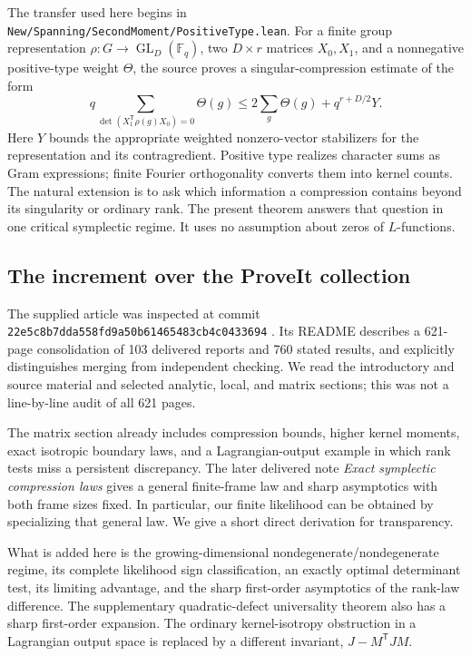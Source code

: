 \documentclass[11pt]{article}
\theoremstyle{definition}\newtheorem{definition}[theorem]{Definition}
\theoremstyle{remark}\newtheorem{remark}[theorem]{Remark}
\newcommand{\F}{\mathbb F}
\newcommand{\GL}{\operatorname{GL}}
\newcommand{\1}{\mathbf 1}
\begin{document}
The transfer used here begins in
\texttt{New/Spanning/SecondMoment/PositiveType.lean}. For a finite group
representation $\rho:G\to\GL_D(\F_q)$, two $D\times r$ matrices $X_0,X_1$,
and a nonnegative positive-type weight $\Theta$, the source proves a
singular-compression estimate of the form
\begin{equation}\label{eq:upstream}
 q\sum_{\det(X_1^{\mathsf T}\rho(g)X_0)=0}\Theta(g)
 \le 2\sum_g\Theta(g)+q^{r+D/2}Y.
\end{equation}
Here $Y$ bounds the appropriate weighted nonzero-vector stabilizers for
the representation and its contragredient. Positive type realizes
character sums as Gram expressions; finite Fourier orthogonality converts
them into kernel counts. The natural extension is to ask which information
a compression contains beyond its singularity or ordinary rank.
The present theorem answers that question in one critical symplectic
regime. It uses no assumption about zeros of $L$-functions.

\subsection{The increment over the ProveIt collection}
The supplied article was inspected at commit
\texttt{22e5c8b7dda558fd9a50b61465483cb4c0433694} \cite{proveit}.
Its README describes a 621-page consolidation of 103 delivered reports and
760 stated results, and explicitly distinguishes merging from independent
checking. We read the introductory and source material and selected
analytic, local, and matrix sections; this was not a line-by-line audit of
all 621 pages.

The matrix section already includes compression bounds, higher kernel
moments, exact isotropic boundary laws, and a Lagrangian-output example
in which rank tests miss a persistent discrepancy. The later delivered
note \emph{Exact symplectic compression laws} \cite{previous} gives a
general finite-frame law and sharp asymptotics with both frame sizes fixed.
In particular, our finite likelihood can be obtained by specializing that
general law. We give a short direct derivation for transparency.

What is added here is the growing-dimensional nondegenerate/nondegenerate
regime, its complete likelihood sign classification, an exactly optimal
determinant test, its limiting advantage, and the sharp first-order
asymptotics of the rank-law difference. The supplementary quadratic-defect
universality theorem also has a sharp first-order expansion. The ordinary
kernel-isotropy obstruction in a Lagrangian output space is replaced by a
different invariant, $J-M^{\mathsf T}JM$.
\end{document}
